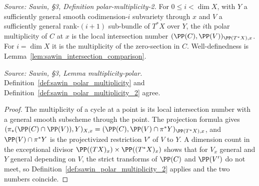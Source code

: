 \begin{definition}
  \label{def:sawin_polar_multiplicity_2}
  \textit{Source: Sawin, §3, Definition polar-multiplicity-2.}
  For $0\le i<\dim X$, with $Y$ a sufficiently general smooth codimension-$i$
  subvariety through $x$ and $V$ a sufficiently general rank-$(i+1)$ sub-bundle of
  $T^*X$ over $Y$, the $i$th polar multiplicity of $C$ at $x$ is the local
  intersection number $(\PP(C),\PP(V))_{\PP(T^*X),x}$.  For $i=\dim X$ it is the
  multiplicity of the zero-section in $C$.  Well-definedness is
  Lemma~\ref{lem:sawin_intersection_comparison}.
\end{definition}

\begin{lemma}
  \label{lem:sawin_multiplicity_polar}
  \textit{Source: Sawin, §3, Lemma multiplicity-polar.}
  Definition~\ref{def:sawin_polar_multiplicity} and
  Definition~\ref{def:sawin_polar_multiplicity_2} agree.
\end{lemma}
\begin{proof}
  The multiplicity of a cycle at a point is its local intersection number with a
  general smooth subscheme through the point.  The projection formula gives
  $(\pi_*(\PP(C)\cap\PP(V)),Y)_{X,x} = (\PP(C),\PP(V)\cap\pi^*Y)_{\PP(T^*X),x}$,
  and $\PP(V)\cap\pi^*Y$ is the projectivized restriction $V'$ of $V$ to $Y$.  A
  dimension count in the exceptional divisor $\PP((TX)_x)\times\PP((T^*X)_x)$
  shows that for $V_x$ general and $Y$ general depending on $V$, the strict
  transforms of $\PP(C)$ and $\PP(V')$ do not meet, so
  Definition~\ref{def:sawin_polar_multiplicity_2} applies and the two numbers
  coincide.
\end{proof}

